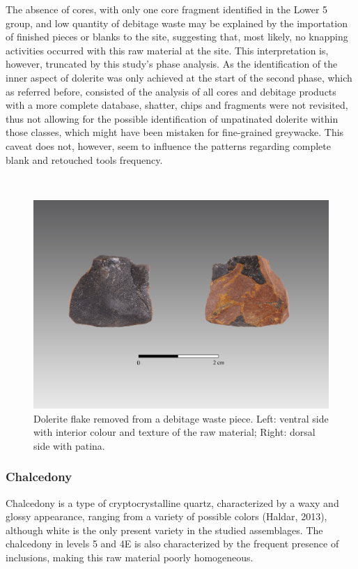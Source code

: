 \documentclass[12pt,twoside]{reedthesis}
\begin{document}
The absence of cores, with only one core fragment identified in the Lower 5 group, and low quantity of debitage waste may be explained by the importation of finished pieces or blanks to the site, suggesting that, most likely, no knapping activities occurred with this raw material at the site. This interpretation is, however, truncated by this study's phase analysis. As the identification of the inner aspect of dolerite was only achieved at the start of the second phase, which as referred before, consisted of the analysis of all cores and debitage products with a more complete database, shatter, chips and fragments were not revisited, thus not allowing for the possible identification of unpatinated dolerite within those classes, which might have been mistaken for fine-grained greywacke. This caveat does not, however, seem to influence the patterns regarding complete blank and retouched tools frequency.

~
\begin{figure}

{\centering \includegraphics[width=0.7\linewidth]{figure/doleritephoto} 

}

\caption[Dolerite flake removed from a debitage waste piece.]{Dolerite flake removed from a debitage waste piece. Left: ventral side with interior colour and texture of the raw material; Right: dorsal side with patina.}\label{fig:doleritephoto}
\end{figure}
\newpage

\hypertarget{chalcedony}{%
\subsubsection{Chalcedony}\label{chalcedony}}

Chalcedony is a type of cryptocrystalline quartz, characterized by a waxy and glossy appearance, ranging from a variety of possible colors (Haldar, 2013), although white is the only present variety in the studied assemblages. The chalcedony in levels 5 and 4E is also characterized by the frequent presence of inclusions, making this raw material poorly homogeneous.
\end{document}
